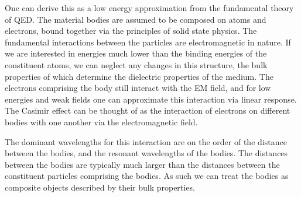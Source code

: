 One can derive this as a low energy approximation from the fundamental theory of QED.  
The material bodies are assumed to be composed on atoms and electrons, bound together via
the principles of solid state physics.  The fundamental interactions between the particles 
are electromagnetic in nature.  If we are interested in energies much lower than the binding energies
of the constituent atoms, we can neglect any changes in this structure, the bulk properties of which determine
the dielectric properties of the medium.  
The electrons comprising the body still interact with the EM field, and for low energies and weak fields
one can approximate this interaction via linear response.  
The Casimir effect can be thought of as the interaction of electrons on different bodies with one another
via the electromagnetic field.  

The dominant wavelengths for this interaction are on the order of the distance between the bodies,
and the resonant wavelengths of the bodies.  The distances between the bodies are typically much
larger than the distances between the constituent particles comprising the bodies.  As such we can treat
the bodies as composite objects described by their bulk properties.    




